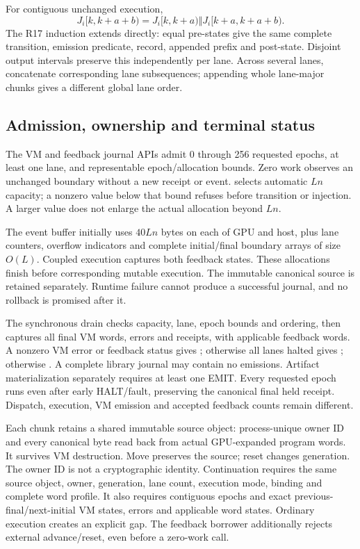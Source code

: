 For contiguous unchanged execution,
\begin{equation}
 J_i[k,k+a+b)=J_i[k,k+a)\Vert J_i[k+a,k+a+b).
 \label{eq:r18-stream-composition}
\end{equation}
The R17 induction extends directly: equal pre-states give the same complete
transition, emission predicate, record, appended prefix and post-state.
Disjoint output intervals preserve this independently per lane. Across
several lanes, concatenate corresponding lane subsequences; appending whole
lane-major chunks gives a different global lane order.

\subsection{Admission, ownership and terminal status}
The VM and feedback journal APIs admit 0 through 256 requested epochs,
at least one lane, and representable epoch/allocation bounds. Zero work
observes an unchanged boundary without a new receipt or event.
 selects automatic $Ln$ capacity; a nonzero value
below that bound refuses before transition or injection. A larger value
does not enlarge the actual allocation beyond $Ln$.

The event buffer initially uses $40Ln$ bytes on each of GPU and host,
plus lane counters, overflow indicators and complete initial/final boundary
arrays of size $O(L)$. Coupled execution captures both feedback states.
These allocations finish before corresponding mutable execution. The
immutable canonical source is retained separately. Runtime failure cannot
produce a successful journal, and no rollback is promised after it.

The synchronous drain checks capacity, lane, epoch bounds and ordering,
then captures all final VM words, errors and receipts, with applicable
feedback words. A nonzero VM error or feedback status gives
; otherwise all lanes halted gives ; otherwise
. A complete library journal may contain no emissions.
Artifact materialization separately requires at least one EMIT.
Every requested epoch runs even after early HALT/fault, preserving the
canonical final held receipt. Dispatch, execution, VM emission and accepted
feedback counts remain different.

Each chunk retains a shared immutable source object: process-unique owner
ID and every canonical  byte read back from actual GPU-expanded
program words. It survives VM destruction. Move preserves the source;
reset changes generation. The owner ID is not a cryptographic identity.
Continuation requires the same source object, owner, generation, lane count,
execution mode, binding and complete word profile. It also requires
contiguous epochs and exact previous-final/next-initial VM states, errors
and applicable word states. Ordinary execution creates an explicit gap.
The feedback borrower additionally rejects external advance/reset, even
before a zero-work call.

